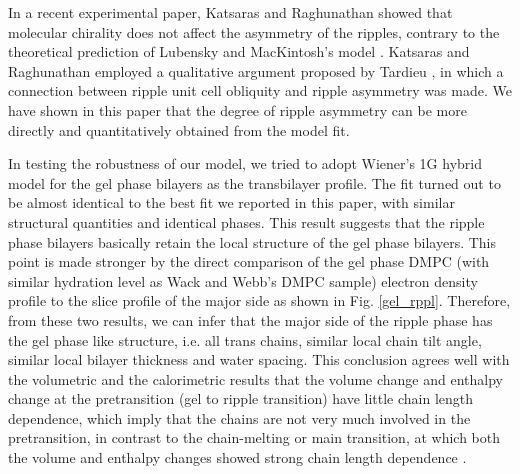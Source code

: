 In a recent experimental paper, Katsaras and Raghunathan \cite{Kat95} showed 
that molecular chirality does not affect the asymmetry of the ripples, contrary
to the theoretical prediction of Lubensky and MacKintosh's model \cite{Lub93}.
Katsaras and Raghunathan employed a qualitative argument proposed by
Tardieu \cite{Tar72}, in which a connection between ripple unit cell
obliquity and ripple asymmetry was made. We have shown in this paper
that the degree of ripple asymmetry can be more directly and quantitatively 
obtained from the model fit.

In testing the robustness of our model, we tried to adopt Wiener's 
\cite{MWTH} 1G hybrid model for the gel phase bilayers as the transbilayer 
profile. 
The fit turned out to be almost identical to the best fit we reported in this 
paper, with similar structural quantities and identical phases. 
This result suggests that the ripple phase bilayers basically retain the 
local structure of the gel phase bilayers. This point is made stronger by the
direct comparison of the gel phase DMPC (with similar hydration level
as Wack and Webb's DMPC sample) electron density profile to the
slice profile of the major side as shown in Fig. \ref{gel_rppl}. Therefore,
from these two results, we can infer that the major side of the ripple 
phase has the gel phase like structure, i.e. all trans chains, similar
local chain tilt angle, similar local bilayer thickness and water spacing.
This conclusion agrees well with the volumetric \cite{NW78} and the
calorimetric \cite{Cev87} results that the volume change and enthalpy
change at the pretransition (gel to ripple transition) have little
chain length dependence, which imply that the chains are not very much
involved in the pretransition, in contrast to the chain-melting or
main transition, at which both the volume and enthalpy changes showed
strong chain length dependence \cite{NW78,Cev87}.

